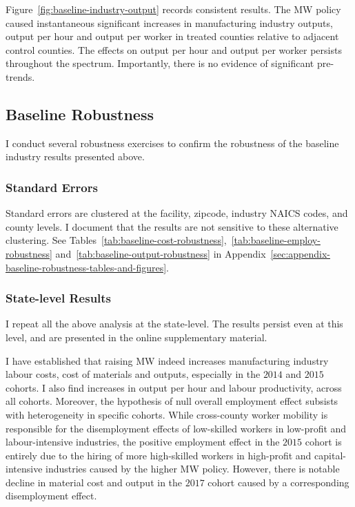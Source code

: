 \documentclass{C:/Users/david/OneDrive/Documents/ULMS/PhD/Thesis/chapter3/src/climate_change/latex/Economic_Journal/OUP-EJ}
\begin{document}
    Figure~\ref{fig:baseline-industry-output} records consistent results. The MW policy caused instantaneous significant increases in manufacturing industry outputs, output per hour and output per worker in treated counties relative to adjacent control counties. The effects on output per hour and output per worker persists throughout the spectrum. Importantly, there is no evidence of significant pre-trends.
    

    \subsection{Baseline Robustness}\label{subsec:baseline-robustness}
    I conduct several robustness exercises to confirm the robustness of the baseline industry results presented above.

    \subsubsection{Standard Errors} Standard errors are clustered at the facility, zipcode, industry NAICS codes, and county levels. I document that the results are not sensitive to these alternative clustering. See Tables~\ref{tab:baseline-cost-robustness},~\ref{tab:baseline-employ-robustness} and~\ref{tab:baseline-output-robustness} in Appendix~\ref{sec:appendix-baseline-robustness-tables-and-figures}.

    \subsubsection{State-level Results} I repeat all the above analysis at the state-level. The results persist even at this level, and are presented in the online supplementary material.

    I have established that raising MW indeed increases manufacturing industry labour costs, cost of materials and outputs, especially in the $2014$ and $2015$ cohorts. I also find increases in output per hour and labour productivity, across all cohorts. Moreover, the hypothesis of null overall employment effect subsists with heterogeneity in specific cohorts. While cross-county worker mobility is responsible for the disemployment effects of low-skilled workers in low-profit and labour-intensive industries, the positive employment effect in the $2015$ cohort is entirely due to the hiring of more high-skilled workers in high-profit and capital-intensive industries caused by the higher MW policy. However, there is notable decline in material cost and output in the $2017$ cohort caused by a corresponding disemployment effect.
\end{document}
